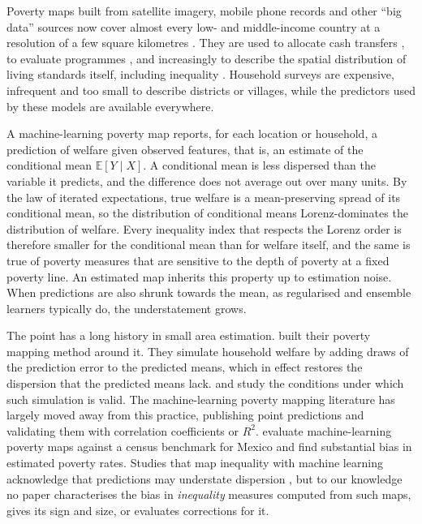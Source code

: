 \documentclass[pdflatex,sn-mathphys-ay]{sn-jnl}
\theoremstyle{thmstyleone}%
\theoremstyle{thmstyletwo}%
\theoremstyle{thmstylethree}%
\newcommand{\E}{\mathbb{E}}
\begin{document}
Poverty maps built from satellite imagery, mobile phone records and other ``big data'' sources now cover almost every low- and middle-income country at a resolution of a few square kilometres \citep{jean2016,blumenstock2015,yeh2020,chi2022}. They are used to allocate cash transfers \citep{aiken2022,smythe2022}, to evaluate programmes \citep{ratledge2022}, and increasingly to describe the spatial distribution of living standards itself, including inequality \citep{pradhan2025}. Household surveys are expensive, infrequent and too small to describe districts or villages, while the predictors used by these models are available everywhere.

A machine-learning poverty map reports, for each location or household, a prediction of welfare given observed features, that is, an estimate of the conditional mean $\E[Y\mid X]$. A conditional mean is less dispersed than the variable it predicts, and the difference does not average out over many units. By the law of iterated expectations, true welfare is a mean-preserving spread of its conditional mean, so the distribution of conditional means Lorenz-dominates the distribution of welfare. Every inequality index that respects the Lorenz order is therefore smaller for the conditional mean than for welfare itself, and the same is true of poverty measures that are sensitive to the depth of poverty at a fixed poverty line. An estimated map inherits this property up to estimation noise. When predictions are also shrunk towards the mean, as regularised and ensemble learners typically do, the understatement grows.

The point has a long history in small area estimation. \citet{ell2003} built their poverty mapping method around it. They simulate household welfare by adding draws of the prediction error to the predicted means, which in effect restores the dispersion that the predicted means lack. \citet{tarozzi2009} and \citet{molina2010} study the conditions under which such simulation is valid. The machine-learning poverty mapping literature has largely moved away from this practice, publishing point predictions and validating them with correlation coefficients or $R^2$. \citet{corral2025} evaluate machine-learning poverty maps against a census benchmark for Mexico and find substantial bias in estimated poverty rates. Studies that map inequality with machine learning acknowledge that predictions may understate dispersion \citep{pradhan2025}, but to our knowledge no paper characterises the bias in \emph{inequality} measures computed from such maps, gives its sign and size, or evaluates corrections for it.
\end{document}
